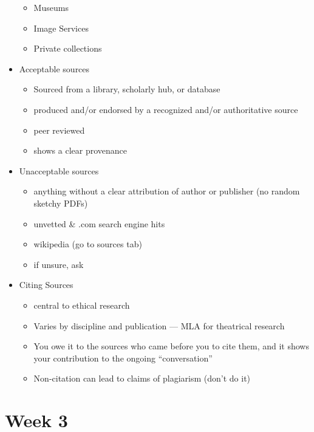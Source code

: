 \documentclass[12pt]{article}
\begin{document}
\begin{itemize}
\begin{itemize}
                    \item Museums
                    \item Image Services
                    \item Private collections
                \end{itemize}
                \item Acceptable sources
                \begin{itemize}
                    \item Sourced from a library, scholarly hub, or database
                    \item produced and/or endorsed by a recognized and/or authoritative source
                    \item peer reviewed
                    \item shows a clear provenance
                \end{itemize}
                \item Unacceptable sources
                \begin{itemize}
                    \item anything without a clear attribution of author or publisher (no random sketchy PDFs)
                    \item unvetted \& .com search engine hits
                    \item wikipedia (go to sources tab)
                    \item if unsure, ask
                \end{itemize}
                \item Citing Sources
                \begin{itemize}
                    \item central to ethical research
                    \item Varies by discipline and publication --- MLA for theatrical research
                    \item You owe it to the sources who came before you to cite them, and it shows your contribution to the ongoing ``conversation''
                    \item Non-citation can lead to claims of plagiarism (don't do it)
                \end{itemize}
            \end{itemize}
            \newpage
    \section{Week 3}
\end{document}
